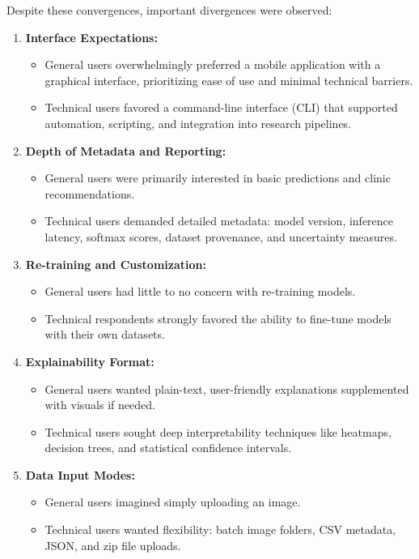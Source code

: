 \documentclass[
  12pt,
  oneside]{article}
\providecommand{\tightlist}{%
  \setlength{\itemsep}{0pt}\setlength{\parskip}{0pt}}
\begin{document}
Despite these convergences, important divergences were observed:

\begin{enumerate}
\def\labelenumi{\arabic{enumi}.}
\item
  \textbf{Interface Expectations:}

  \begin{itemize}
  \tightlist
  \item
    General users overwhelmingly preferred a mobile application with a
    graphical interface, prioritizing ease of use and minimal technical
    barriers.\\
  \item
    Technical users favored a command-line interface (CLI) that
    supported automation, scripting, and integration into research
    pipelines.
  \end{itemize}
\item
  \textbf{Depth of Metadata and Reporting:}

  \begin{itemize}
  \tightlist
  \item
    General users were primarily interested in basic predictions and
    clinic recommendations.\\
  \item
    Technical users demanded detailed metadata: model version, inference
    latency, softmax scores, dataset provenance, and uncertainty
    measures.
  \end{itemize}
\item
  \textbf{Re-training and Customization:}

  \begin{itemize}
  \tightlist
  \item
    General users had little to no concern with re-training models.\\
  \item
    Technical respondents strongly favored the ability to fine-tune
    models with their own datasets.
  \end{itemize}
\item
  \textbf{Explainability Format:}

  \begin{itemize}
  \tightlist
  \item
    General users wanted plain-text, user-friendly explanations
    supplemented with visuals if needed.\\
  \item
    Technical users sought deep interpretability techniques like
    heatmaps, decision trees, and statistical confidence intervals.
  \end{itemize}
\item
  \textbf{Data Input Modes:}

  \begin{itemize}
  \tightlist
  \item
    General users imagined simply uploading an image.\\
  \item
    Technical users wanted flexibility: batch image folders, CSV
    metadata, JSON, and zip file uploads.
  \end{itemize}
\end{enumerate}
\end{document}
